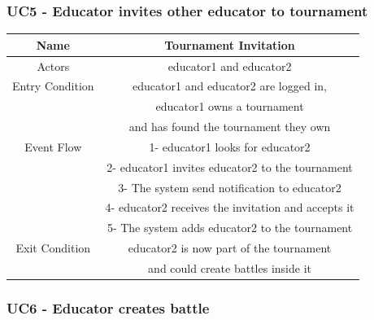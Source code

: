 \documentclass{article}
\begin{document}
\subsubsection*{UC5 - Educator invites other educator to tournament}

\begin{tabular*}{\linewidth}{@{\extracolsep{\fill}} cc }
    \hline
    Name & Tournament Invitation \\ 
    \hline
    Actors & educator1 and educator2 \\ 
    \hline
    Entry Condition & educator1 and educator2 are logged in, \\
                    & educator1 owns a tournament\\
                    & and has found the tournament they own\\ 
    \hline
    Event Flow & 1- educator1 looks for educator2\\
               & 2- educator1 invites educator2 to the tournament\\
               & 3- The system send notification to educator2\\    
               & 4- educator2 receives the invitation and accepts it\\
               & 5- The system adds educator2 to the tournament\\
    \hline
    Exit Condition & educator2 is now part of the tournament\\
                   &  and could create battles inside it\\
    \hline
\end{tabular*}

\subsubsection*{UC6 - Educator creates battle}
\end{document}
